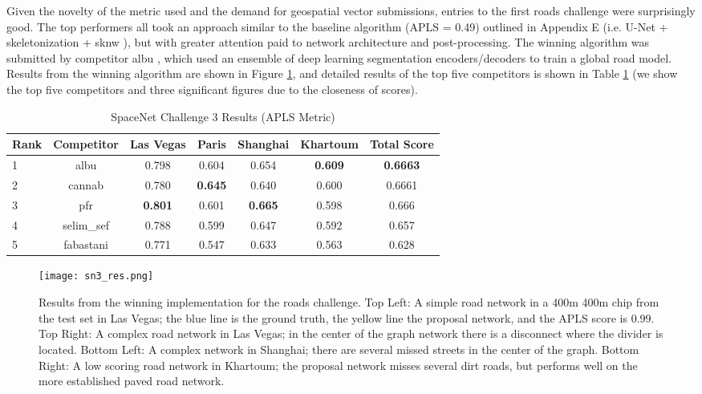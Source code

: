 \documentclass{article}
\begin{document}
Given the novelty of the metric used and the demand for geospatial vector submissions, entries to the first roads challenge were surprisingly good.
The top performers all took an approach similar to the baseline algorithm (APLS = 0.49) outlined in Appendix E (i.e. U-Net + skeletonization + sknw \cite{sknw}), but with greater attention paid to network architecture and post-processing. 
The winning algorithm was submitted by competitor albu \cite{albu},  which used an ensemble of deep learning segmentation encoders/decoders to train a global road model.  Results from the winning algorithm are shown in Figure \ref{fig:sn3_res}, and detailed results of the top five competitors is shown in Table \ref{tab:sn3_res} (we show the top five competitors and three significant figures due to the closeness of scores).

\begin{table}
  \caption{SpaceNet Challenge 3 Results (APLS Metric)}
  \label{tab:sn3_res}
  \centering
   \begin{tabular}{lcccccc}
    \toprule
    Rank & Competitor & Las Vegas & Paris & Shanghai & Khartoum & Total Score \\
    \hline
    1 & albu 	  & 0.798 & 0.604 & 0.654 & \bf{0.609} & \bf{0.6663} \\
    2 & cannab 	  & 0.780 & \bf{0.645} & 0.640 & 0.600 & 0.6661 \\
    3 & pfr 		  & \bf{0.801} & 0.601 & \bf{0.665} & 0.598 & 0.666 \\  
    4 & selim\_sef & 0.788 & 0.599 & 0.647 & 0.592 & 0.657 \\  
    5 & fabastani  & 0.771 & 0.547 & 0.633 & 0.563 & 0.628 \\  
    \bottomrule
  \end{tabular}
\end{table}



\begin{figure}
  \centering
     \texttt{[image: sn3\_res.png]}
  \caption{Results from the winning implementation for the roads challenge.  Top Left:  A simple road network in a 400m  400m chip from the test set in Las Vegas; the blue line is the ground truth, the yellow line the proposal network, and the APLS score is 0.99. Top Right: A complex road network in Las Vegas; in the center of the graph network there is a disconnect where the divider is located.  Bottom Left: A complex network in Shanghai; there are several missed streets in the center of the graph. Bottom Right: A low scoring road network in Khartoum; the proposal network misses several dirt roads, but performs well on the more established paved road network.}
  \label{fig:sn3_res}
\end{figure}
\end{document}
